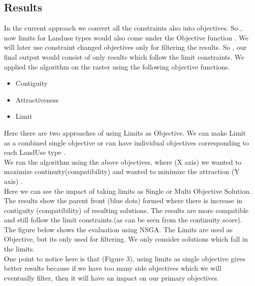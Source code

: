 \documentclass[twoside,10pt]{article}
\begin{document}
\subsection{Results}
In the current approach we convert all the constraints also into objectives. So , now limits  for Landuse types would also come under the Objective function . We will later use constraint changed objectives only for filtering the results. So , our final output would consist of only results which follow the limit constraints.
We applied the algorithm  on the raster using the following objective functions. \\
\begin{itemize}
\item Contiguity
\item Attractiveness
\item Limit
\end{itemize}
Here there are two approaches of using Limits as Objective. We can make Limit as a combined single objective or can have individual objectives corresponding to each LandUse type . \\
We ran the algorithm using the above objectives, where (X axis) we wanted to maximize continuity(compatibility) and wanted to minimize the attraction (Y axis) .\\
Here we can see the impact of taking limits as Single or Multi Objective Solution.
The results show the parent front (blue dots) formed where there is increase in contiguity (compatibility) of resulting solutions. The results are more compatible and still follow the limit constraints.(as can be seen from the continuity score). \\[.25cm]
The figure below shows the evaluation using NSGA. The  Limits are used as Objective, but its only used for filtering. We only consider solutions which fall in the limits. \\
 One point to notice here is that (Figure 3), using limits as single objective gives better results because if we have too many side objectives which we will eventually filter, then it will have an impact on our primary objectives.\\
\end{document}
